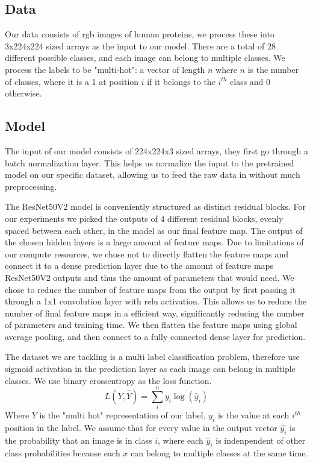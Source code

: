 \documentclass{article}
\begin{document}
\subsection{Data}
Our data consists of rgb images of human proteins, we process these into 3x224x224 sized
arrays as the input to our model. There are a total of 28 different possible classes,
and each image can belong to multiple classes. We process the labels to be "multi-hot":
a vector of length $n$ where $n$ is the number of classes, where it is a 1 at position $i$ if 
it belongs to the $i^{th}$ class and 0 otherwise.
\subsection{Model}

The input of our model consists of 224x224x3 sized arrays, they first go through a batch normalization layer\cite{ioffe2015batch}. This helps
us normalize the input to the pretrained model on our specific dataset, allowing us 
to feed the raw data in without much preprocessing.

The ResNet50V2 model is conveniently structured as distinct residual blocks.
For our experiments we picked the outputs of 4 different residual blocks, evenly spaced between each other, in the model
as our final feature map. The output of the chosen hidden layers is a large amount of 
feature maps. Due to limitations of our compute resources, we chose not to directly flatten the feature maps and connect it to a dense prediction
layer due to the amount of feature maps ResNet50V2 outputs and thus the amount of parameters that would need. We chose to reduce the number of 
feature maps from the output by first passing it through a 1x1 convolution layer\cite{szegedy2014going} with 
relu activation. This allows us to reduce the number of final feature maps in a efficient way, significantly reducing the number of parameters and training time. 
We then flatten the feature maps using global average pooling\cite{Lin2013NetworkIN}, and then connect to a 
fully connected dense layer for prediction. 

The dataset we are tackling is a multi label classification problem, therefore use sigmoid activation
in the prediction layer as each image can belong in multiple classes. We  use binary crossentropy as the loss function. 
\begin{equation}
    L(Y, \hat{Y}) = \sum_i^n y_i\log{(\hat{y}_i)}
\end{equation}
Where $Y$ is the "multi hot" representation of our label, $y_i$
is the value at each $i^{th}$ position in the label.  We assume that for every value in the output vector $\hat{y_i}$ is the probability
that an image is in class $i$, where each $\hat{y}_i$ is indenpendent of other class probabilities because 
each $x$ can belong to multiple classes at the same time. 
\end{document}
